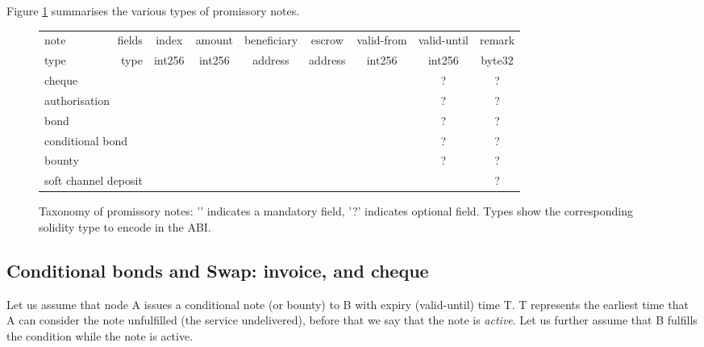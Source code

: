 Figure \ref{fig:taxonomy} summarises the various types of promissory notes.

\newcommand{\tick}{\checkmark}
\newcommand{\opt}{?}
\begin{center}
\begin{figure}
\begin{center}
\begin{tabular}{|l|r||c|c|c|c|c|c|c|}
\hline
note & fields
& index
& amount
& beneficiary
& escrow
& valid-from
& valid-until
& remark
\\
\cline{2-9}

type & type 
& int256
& int256
& address
& address
& int256
& int256
& byte32
\\
\hline
\hline
\multicolumn{2}{|l||}{cheque}   & \tick & \tick & \tick & & & \opt& \opt
\\
\multicolumn{2}{|l||}{authorisation} &  & \tick & \tick & & & \opt& \opt
\\
\multicolumn{2}{|l||}{bond} & \tick & \tick & \tick & & \tick & \opt& \opt
\\
\multicolumn{2}{|l||}{conditional bond} &  & \tick & \tick & \tick & \tick & \opt& \opt
\\
\multicolumn{2}{|l||}{bounty} & \tick &  \tick & & \tick & \tick & \opt& \opt
\\
\multicolumn{2}{|l||}{soft channel deposit} &  \tick & \tick & & & && \opt
\\
\hline
\end{tabular}
\end{center}
\caption{Taxonomy of promissory notes: '\tick' indicates a mandatory field, '?' indicates optional field. Types show the corresponding solidity type to encode in the ABI. }
\label{fig:taxonomy}
\end{figure}
\end{center}



\subsection{Conditional bonds and Swap: invoice, and cheque}

Let us assume that node A issues a conditional note (or bounty) to B with expiry (valid-until) time T. T represents the earliest time that A can consider the note unfulfilled (the service undelivered), before that we say that the note is \emph{active}. Let us further assume that B fulfills the condition while the note is active.

